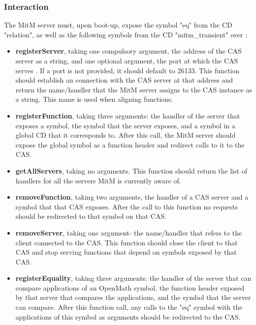 \subsubsection{Interaction}
The MitM server must, upon boot-up, expose the symbol "eq" from the CD 
"relation", as well as the following symbols from the CD "mitm\_transient"
over \SCSCP:
\begin{itemize}
  \item \textbf{registerServer}, taking one compulsory argument, the address of the
    CAS server as a string, and one optional argument, the port at which the CAS
    serves \SCSCP. If a port is not provided, it should default to 26133. This
    function should establish an \SCSCP connection with the CAS server at that 
    address and return the name/handler that the MitM server assigns to the 
    CAS instance as a string. This name is used when aligning functions.
  \item \textbf{registerFunction}, taking three arguments: the handler of the 
    server that exposes a symbol, the symbol that the server exposes, and
    a symbol in a global CD that it corresponds to. After this call, the MitM
    server should expose the global symbol as a function header and redirect
    calls to it to the CAS.
  \item \textbf{getAllServers}, taking no arguments. This function should return 
    the list of handlers for all the servers MitM is currently aware of.
  \item \textbf{removeFunction}, taking two arguments, the handler of a CAS server 
    and a symbol that that CAS exposes. After the call to this function no 
    requests should be redirected to that symbol on that CAS.
  \item \textbf{removeServer}, taking one argument- the name/handler that refers
    to the client connected to the CAS. This function should close the \SCSCP client
    to that CAS and stop serving functions that depend on symbols exposed by
    that CAS.
  \item \textbf{registerEquality}, taking three arguments: the handler of the 
    server that can compare applications of an OpenMath symbol, the function
    header exposed by that server that compares the applications, and the symbol
    that the server can compare. After this function call, any calls to the "eq"
    symbol with the applications of this symbol as arguments should be redirected
    to the CAS.
\end{itemize}

